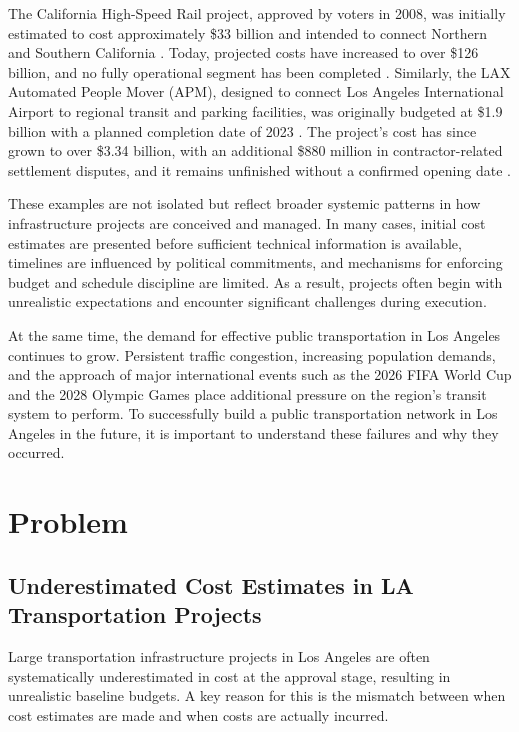\documentclass[12pt]{article}
\begin{document}
    The California High-Speed Rail project, approved by voters in 2008, was initially estimated to cost approximately \$33 billion and intended to connect Northern and Southern California \cite{j3}. Today, projected costs have increased to over \$126 billion, and no fully operational segment has been completed \cite{j3}. Similarly, the LAX Automated People Mover (APM), designed to connect Los Angeles International Airport to regional transit and parking facilities, was originally budgeted at \$1.9 billion with a planned completion date of 2023 \cite{j4}. The project's cost has since grown to over \$3.34 billion, with an additional \$880 million in contractor-related settlement disputes, and it remains unfinished without a confirmed opening date \cite{j4}.

    These examples are not isolated but reflect broader systemic patterns in how infrastructure projects are conceived and managed. In many cases, initial cost estimates are presented before sufficient technical information is available, timelines are influenced by political commitments, and mechanisms for enforcing budget and schedule discipline are limited. As a result, projects often begin with unrealistic expectations and encounter significant challenges during execution.

    At the same time, the demand for effective public transportation in Los Angeles continues to grow. Persistent traffic congestion, increasing population demands, and the approach of major international events such as the 2026 FIFA World Cup and the 2028 Olympic Games place additional pressure on the region's transit system to perform. To successfully build a public transportation network in Los Angeles in the future, it is important to understand these failures and why they occurred.

    \newpage
    \section{Problem}

        \subsection{Underestimated Cost Estimates in LA Transportation Projects}

        Large transportation infrastructure projects in Los Angeles are often systematically underestimated in cost at the approval stage, resulting in unrealistic baseline budgets. A key reason for this is the mismatch between when cost estimates are made and when costs are actually incurred.
\end{document}
